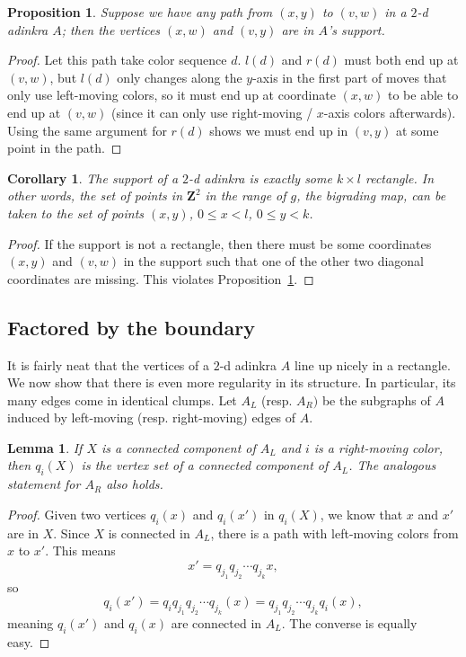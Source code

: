 \documentclass[12pt,twoside,singlespace]{article}
\numberwithin{equation}{section}
\newtheorem{lem}[equation]{Lemma}
\newtheorem{cor}[equation]{Corollary}
\newtheorem{prop}[equation]{Proposition}
\theoremstyle{definition}
\newcommand{\ZZ}{\mathbf{Z}}
\begin{document}
\begin{prop}
\label{prop:rectangle-completion}
Suppose we have any path from $(x,y)$ to $(v,w)$ in a $2$-d adinkra $A$; then the vertices $(x,w)$ and $(v,y)$ are in $A$'s support.
\end{prop}
\begin{proof}
Let this path take color sequence $d$. $l(d)$ and $r(d)$ must both end up at $(v,w)$, but $l(d)$ only changes along the $y$-axis in the first part of moves that only use left-moving colors, so it must end up at coordinate $(x,w)$ to be able to end up at $(v,w)$ (since it can only use right-moving / $x$-axis colors afterwards). Using the same argument for $r(d)$ shows we must end up in $(v,y)$ at some point in the path.
\end{proof}

\begin{cor}
\label{cor:rectangle}
The support of a $2$-d adinkra is exactly some $k \times l$ rectangle. In other words, the set of points in $\ZZ^2$ in the range of $g$, the bigrading map, can be taken to the set of points $(x,y)$, $0 \leq x < l$, $0 \leq y < k$.
\end{cor}
\begin{proof}
If the support is not a rectangle, then there must be some coordinates $(x,y)$ and $(v,w)$ in the support such that one of the other two diagonal coordinates are missing. This violates Proposition~\ref{prop:rectangle-completion}.
\end{proof}

\subsection{Factored by the boundary}

It is fairly neat that the vertices of a $2$-d adinkra $A$ line up nicely in a rectangle. We now show that there is even more regularity in its structure. In particular, its many edges come in identical clumps. Let $A_L$ (resp. $A_R)$ be the subgraphs of $A$ induced by left-moving (resp. right-moving) edges of $A$. %

\begin{lem}
\label{lem:kevin-translate-component}
If $X$ is a connected component of $A_L$ and $i$ is a right-moving color, then $q_i(X)$ is the vertex set of a connected component of $A_L$. The analogous statement for $A_R$ also holds.
\end{lem}
\begin{proof}
Given two vertices $q_i(x)$ and $q_i(x')$ in $q_i(X)$, we know that $x$ and $x'$ are in $X$. Since $X$ is connected in $A_L$, there is a path with left-moving colors from $x$ to $x'$. This means 
\[
x' = q_{j_1}q_{j_2}\cdots q_{j_k} x,
\]
so
\[
q_i (x') = q_i q_{j_1} q_{j_2} \cdots q_{j_k} (x) = q_{j_1} q_{j_2} \cdots q_{j_k} q_i (x),
\]
meaning $q_i(x')$ and $q_i(x)$ are connected in $A_L$. The converse is equally easy.
\end{proof}
\end{document}
